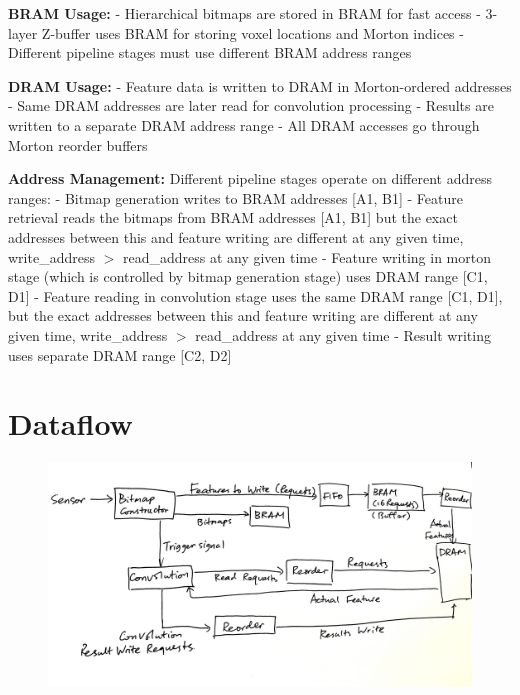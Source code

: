 \documentclass[12pt]{article}
\begin{document}
\textbf{BRAM Usage:}
- Hierarchical bitmaps are stored in BRAM for fast access
- 3-layer Z-buffer uses BRAM for storing voxel locations and Morton indices
- Different pipeline stages must use different BRAM address ranges

\textbf{DRAM Usage:}
- Feature data is written to DRAM in Morton-ordered addresses
- Same DRAM addresses are later read for convolution processing
- Results are written to a separate DRAM address range
- All DRAM accesses go through Morton reorder buffers

\textbf{Address Management:}
Different pipeline stages operate on different address ranges:
- Bitmap generation writes to BRAM addresses [A1, B1]
\newline
- Feature retrieval reads the bitmaps from BRAM addresses [A1, B1] but the exact addresses between this and feature writing are different at any given time, write\_address $>$ read\_address
 at any given time
 \newline
- Feature writing in morton stage (which is controlled by bitmap generation stage) uses DRAM range [C1, D1]
\newline
- Feature reading in convolution stage uses the same DRAM range [C1, D1], but the exact addresses between this and feature writing are different at any given time, write\_address $>$ read\_address
 at any given time
 \newline
- Result writing uses separate DRAM range [C2, D2]

\section{Dataflow}
\begin{figure}[htbp]
    \centering
    \includegraphics[scale=0.14]{dataflow.jpeg}
    \label{fig:dataflow}
\end{figure}
\end{document}
